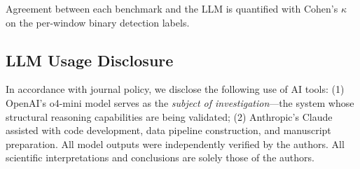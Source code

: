 Agreement between each benchmark and the LLM is quantified with Cohen's
$\kappa$ on the per-window binary detection labels.

\subsection{LLM Usage Disclosure}

In accordance with journal policy, we disclose the following use of AI tools: (1) OpenAI's o4-mini model serves as the \textit{subject of investigation}---the system whose structural reasoning capabilities are being validated; (2) Anthropic's Claude assisted with code development, data pipeline construction, and manuscript preparation. All model outputs were independently verified by the authors. All scientific interpretations and conclusions are solely those of the authors.
